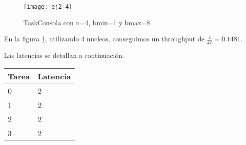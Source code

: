 \begin{figure}[H]
    \centering
    \texttt{[image: ej2-4]}
    \caption{TaskConsola con n=4, bmin=1 y bmax=8}
    \label{fig:ej2.4}
\end{figure}

En la figura \ref{fig:ej2.4}, utilizando 4 nucleos, conseguimos un throughput de $\frac{4}{27} = 0.1481$.

Las latencias se detallan a continuación.

\begin{center}
    \begin{tabular}{| l | l |}
        \hline
        Tarea & Latencia \\ \hline
        0 & 2 \\
        1 & 2 \\
        2 & 2 \\
        3 & 2 \\
        \hline
    \end{tabular}
\end{center}

